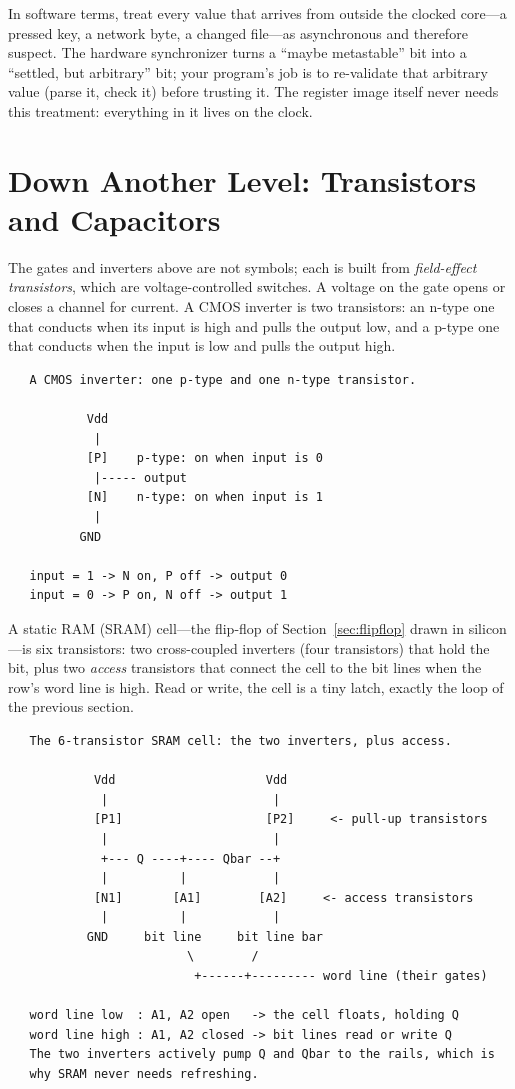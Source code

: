 \begin{ruleofthumb}
In software terms, treat every value that arrives from outside the
clocked core---a pressed key, a network byte, a changed file---as
asynchronous and therefore suspect. The hardware synchronizer turns a
``maybe metastable'' bit into a ``settled, but arbitrary'' bit; your
program's job is to re-validate that arbitrary value (parse it, check
it) before trusting it. The register image itself never needs this
treatment: everything in it lives on the clock.
\end{ruleofthumb}

\section{Down Another Level: Transistors and Capacitors}
\label{sec:transistors}

The gates and inverters above are not symbols; each is built from
\emph{field-effect transistors}, which are voltage-controlled
switches. A voltage on the gate opens or closes a channel for
current. A CMOS inverter is two transistors: an n-type one that
conducts when its input is high and pulls the output low, and a
p-type one that conducts when the input is low and pulls the output
high.

\begin{verbatim}
   A CMOS inverter: one p-type and one n-type transistor.

           Vdd
            |
           [P]    p-type: on when input is 0
            |----- output
           [N]    n-type: on when input is 1
            |
          GND

   input = 1 -> N on, P off -> output 0
   input = 0 -> P on, N off -> output 1
\end{verbatim}

A static RAM (SRAM) cell---the flip-flop of Section~\ref{sec:flipflop}
drawn in silicon---is six transistors: two cross-coupled inverters
(four transistors) that hold the bit, plus two \emph{access}
transistors that connect the cell to the bit lines when the row's
word line is high. Read or write, the cell is a tiny latch, exactly
the loop of the previous section.

\begin{verbatim}
   The 6-transistor SRAM cell: the two inverters, plus access.

            Vdd                     Vdd
             |                       |
            [P1]                    [P2]     <- pull-up transistors
             |                       |
             +--- Q ----+---- Qbar --+
             |          |            |
            [N1]       [A1]        [A2]     <- access transistors
             |          |            |
           GND     bit line     bit line bar
                         \        /
                          +------+--------- word line (their gates)

   word line low  : A1, A2 open   -> the cell floats, holding Q
   word line high : A1, A2 closed -> bit lines read or write Q
   The two inverters actively pump Q and Qbar to the rails, which is
   why SRAM never needs refreshing.
\end{verbatim}

